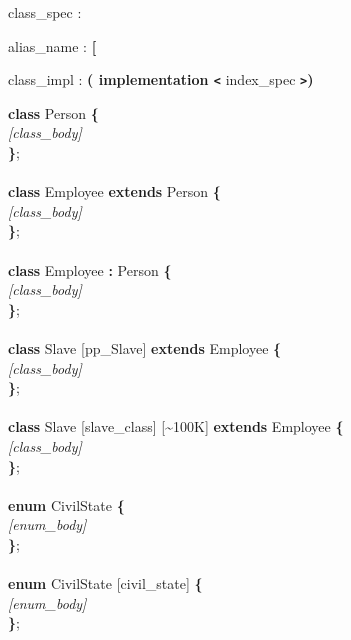 
\begin{tabbing}
\grindent
class\_spec \> : 
\end{tabbing}

\begin{tabbing}
\grindent
alias\_name \> : {\bf [} \ident {\bf ]}
\end{tabbing}

\begin{tabbing}
\grindent
class\_impl \> : {\bf ( implementation \texttt{<}} index\_spec {\bf \texttt{>})}
\end{tabbing}


\begin{tabbing}
{\bf cla}\={\bf ss} Person {\bf \{}\\
\>\emph{[class\_body]}\\
{\bf \}};\\
\\
{\bf class} Employee {\bf extends} Person {\bf \{}\\
\>\emph{[class\_body]}\\
{\bf \}};\\
\\
{\bf class} Employee {\bf :} Person {\bf \{}\\
\>\emph{[class\_body]}\\
{\bf \}};\\
\\
{\bf class} Slave [pp\_Slave] {\bf extends} Employee {\bf \{}\\
\>\emph{[class\_body]}\\
{\bf \}};\\
\\
{\bf class} Slave [slave\_class] [\~{ }100K] {\bf extends} Employee {\bf \{}\\
\>\emph{[class\_body]}\\
{\bf \}};\\
\\
{\bf enum} CivilState {\bf \{}\\
\>\emph{[enum\_body]}\\
{\bf \}};\\
\\
{\bf enum} CivilState [civil\_state] {\bf \{}\\
\>\emph{[enum\_body]}\\
{\bf \}};
\end{tabbing}

